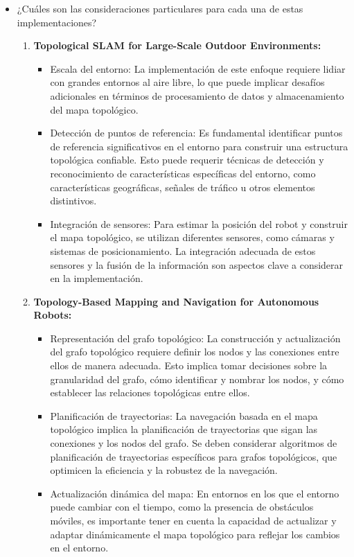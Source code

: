 \documentclass{article}
\begin{document}
\begin{itemize}
\item {¿Cuáles son las consideraciones particulares para cada una de estas implementaciones?} %

  \begin{enumerate}
  \item \textbf{Topological SLAM for Large-Scale Outdoor Environments:}
    \begin{itemize}
    \item Escala del entorno: La implementación de este enfoque requiere lidiar con grandes entornos al aire libre, lo que puede implicar desafíos adicionales en términos de procesamiento de datos y almacenamiento del mapa topológico.
    \item Detección de puntos de referencia: Es fundamental identificar puntos de referencia significativos en el entorno para construir una estructura topológica confiable. Esto puede requerir técnicas de detección y reconocimiento de características específicas del entorno, como características geográficas, señales de tráfico u otros elementos distintivos.
    \item Integración de sensores: Para estimar la posición del robot y construir el mapa topológico, se utilizan diferentes sensores, como cámaras y sistemas de posicionamiento. La integración adecuada de estos sensores y la fusión de la información son aspectos clave a considerar en la implementación.
    \end{itemize}
  \item \textbf{Topology-Based Mapping and Navigation for Autonomous Robots:}

    \begin{itemize}
    \item Representación del grafo topológico: La construcción y actualización del grafo topológico requiere definir los nodos y las conexiones entre ellos de manera adecuada. Esto implica tomar decisiones sobre la granularidad del grafo, cómo identificar y nombrar los nodos, y cómo establecer las relaciones topológicas entre ellos.
    \item Planificación de trayectorias: La navegación basada en el mapa topológico implica la planificación de trayectorias que sigan las conexiones y los nodos del grafo. Se deben considerar algoritmos de planificación de trayectorias específicos para grafos topológicos, que optimicen la eficiencia y la robustez de la navegación.
      \item Actualización dinámica del mapa: En entornos en los que el entorno puede cambiar con el tiempo, como la presencia de obstáculos móviles, es importante tener en cuenta la capacidad de actualizar y adaptar dinámicamente el mapa topológico para reflejar los cambios en el entorno.
    \end{itemize}


\end{enumerate}
\end{itemize}
\end{document}
